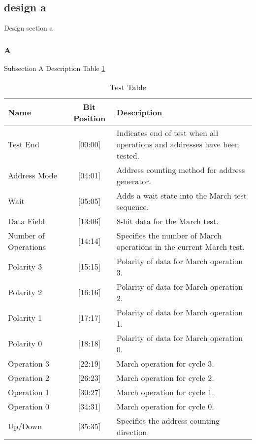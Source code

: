 \subsection{design a}
\label{sect:design-a}
Design section a

\subsubsection{A}
Subsection A Description  Table \ref{tab:instreg} 

\begin{table}[H]
  \caption{Test Table}
  \centering
  \begin{tabular}{|p{1in}|c|p{3in}|}
  \hline
  Name & Bit Position & Description \\
  \hline\hline
  Test End & [00:00] & Indicates end of test when all operations and addresses have been tested. \\ \hline
  Address Mode & [04:01] & Address counting method for address generator. \\ \hline
  Wait & [05:05] & Adds a wait state into the March test sequence. \\ \hline
  Data Field & [13:06] & 8-bit data for the March test. \\ \hline
  Number of Operations & [14:14] & Specifies the number of March operations in the current March test. \\ \hline
  Polarity 3 & [15:15] & Polarity of data for March operation 3. \\ \hline
  Polarity 2 & [16:16] & Polarity of data for March operation 2. \\ \hline
  Polarity 1 & [17:17] & Polarity of data for March operation 1. \\ \hline
  Polarity 0 & [18:18] & Polarity of data for March operation 0. \\ \hline
  Operation 3 & [22:19] & March operation for cycle 3. \\ \hline
  Operation 2 & [26:23] & March operation for cycle 2. \\ \hline
  Operation 1 & [30:27] & March operation for cycle 1. \\ \hline
  Operation 0 & [34:31] & March operation for cycle 0. \\ \hline
  Up/Down & [35:35] & Specifies the address counting direction. \\ \hline
  \end{tabular}
  \label{tab:instreg}
\end{table}

